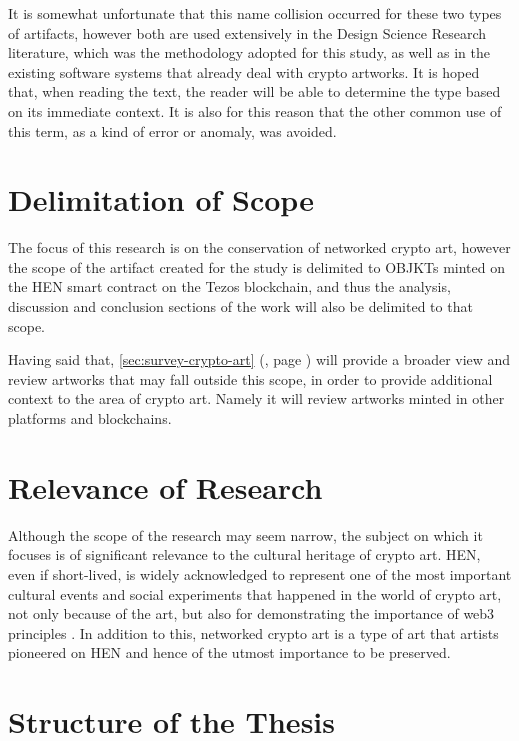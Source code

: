 \vspace{0.5cm}

It is somewhat unfortunate that this name collision occurred for these two types of artifacts, however both are used extensively in the Design Science Research literature, which was the methodology adopted for this study, as well as in the existing software systems that already deal with crypto artworks. It is hoped that, when reading the text, the reader will be able to determine the type based on its immediate context. It is also for this reason that the other common use of this term, as a kind of error or anomaly, was avoided. 

\section{Delimitation of Scope}

The focus of this research is on the conservation of networked crypto art, however the scope of the artifact created for the study is delimited to OBJKTs minted on the HEN smart contract on the Tezos blockchain, and thus the analysis, discussion and conclusion sections of the work will also be delimited to that scope.

Having said that, \autoref{sec:survey-crypto-art} (, page \pageref{sec:survey-crypto-art})  will provide a broader view and review artworks that may fall outside this scope, in order to provide additional context to the area of crypto art. Namely it will review artworks minted in other platforms and blockchains.

\section{Relevance of Research}

Although the scope of the research may seem narrow, the subject on which it focuses is of significant relevance to the cultural heritage of crypto art.
HEN, even if short-lived, is widely acknowledged to represent one of the most important cultural events and social experiments that happened in the world of crypto art, not only because of the art, but also for demonstrating the importance of web3 principles \cite{rcsEarlyDaysHic2023} \cite{baileyHicNuncBrings2021} \cite{drubayHowHicNunc2021}.
In addition to this, networked crypto art is a type of art that artists pioneered on HEN and hence of the utmost importance to be preserved.

\section{Structure of the Thesis}

